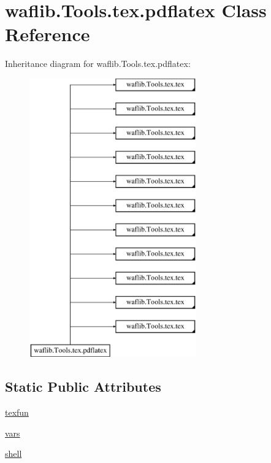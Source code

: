 \hypertarget{classwaflib_1_1_tools_1_1tex_1_1pdflatex}{}\section{waflib.\+Tools.\+tex.\+pdflatex Class Reference}
\label{classwaflib_1_1_tools_1_1tex_1_1pdflatex}
Inheritance diagram for waflib.\+Tools.\+tex.\+pdflatex\+:\begin{figure}[H]
\begin{center}
\leavevmode
\includegraphics[height=12.000000cm]{classwaflib_1_1_tools_1_1tex_1_1pdflatex}
\end{center}
\end{figure}
\subsection*{Static Public Attributes}
\begin{DoxyCompactItemize}
\item 
\hyperlink{classwaflib_1_1_tools_1_1tex_1_1pdflatex_a2df1898d0457bb836430bbb93f0af922}{texfun}
\item 
\hyperlink{classwaflib_1_1_tools_1_1tex_1_1pdflatex_a62ccd368b637f63992528146005c1a50}{vars}
\item 
\hyperlink{classwaflib_1_1_tools_1_1tex_1_1pdflatex_acbe0f123879510fb095ea9f5682a7e79}{shell}
\end{DoxyCompactItemize}
